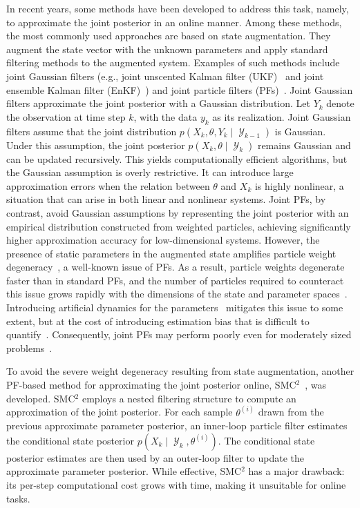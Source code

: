 \documentclass[preprint,3p,times]{elsarticle}
\DeclareMathOperator{\Y}{\mathcal{Y}}
\begin{document}
In recent years, some methods have been developed to address this task, namely, to approximate the joint posterior in an online manner. Among these methods, the most commonly used approaches are based on state augmentation. They augment the state vector with the unknown parameters and apply standard filtering methods to the augmented system. Examples of such methods include joint Gaussian filters (e.g., joint unscented Kalman filter (UKF)~\cite{joint_ukf2,joint_ukf3} and joint ensemble Kalman filter (EnKF)~\cite{joint_enkf}) and joint particle filters (PFs)~\cite{joint_pf_1,joint_pf_2}. Joint Gaussian filters approximate the joint posterior with a Gaussian distribution. Let $Y_k$ denote the observation at time step $k$, with the data $y_k$ as its realization. Joint Gaussian filters assume that the joint distribution $p(X_k, \theta, Y_k \mid \Y_{k-1})$ is Gaussian. Under this assumption, the joint posterior $p(X_k,\theta \mid \Y_k)$ remains Gaussian and can be updated recursively. This yields computationally efficient algorithms, but the Gaussian assumption is overly restrictive. It can introduce large approximation errors when the relation between $\theta$ and $X_k$ is highly nonlinear, a situation that can arise in both linear and nonlinear systems. Joint PFs, by contrast, avoid Gaussian assumptions by representing the joint posterior with an empirical distribution constructed from weighted particles, achieving significantly higher approximation accuracy for low-dimensional systems. However, the presence of static parameters in the augmented state amplifies particle weight degeneracy~\cite{joint_pf_issue}, a well-known issue of PFs. As a result, particle weights degenerate faster than in standard PFs, and the number of particles required to counteract this issue grows rapidly with the dimensions of the state and parameter spaces~\cite{Snyder2008Obstacles}. Introducing artificial dynamics for the parameters~\cite{joint_pf_1} mitigates this issue to some extent, but at the cost of introducing estimation bias that is difficult to quantify~\cite{joint_pf_issue}. Consequently, joint PFs may perform poorly even for moderately sized problems~\cite{fbovi}. 

To avoid the severe weight degeneracy resulting from state augmentation, another PF-based method for approximating the joint posterior online, SMC$^2$~\cite{Chopin2013SMC2}, was developed. SMC$^2$ employs a nested filtering structure to compute an approximation of the joint posterior. For each sample $\theta^{(i)}$ drawn from the previous approximate parameter posterior, an inner-loop particle filter estimates the conditional state posterior $p(X_k \mid \Y_k,\theta^{(i)})$. The conditional state posterior estimates are then used by an outer-loop filter to update the approximate parameter posterior. While effective, SMC$^2$ has a major drawback: its per-step computational cost grows with time, making it unsuitable for online tasks.
\end{document}
